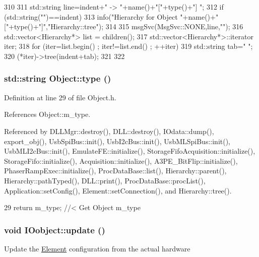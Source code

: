 \begin{DoxyCode}
310                                     {
311   std::string line=indent+" -> "+name()+"["+type()+"] ";
312   if (std::string("")==indent){
313     info("Hierarchy for Object "+name()+"["+type()+"]","Hierarchy::tree");
314   }
315   msgSvc(MsgSvc::NONE,line,"");
316   std::vector<Hierarchy*> list = children();
317   std::vector<Hierarchy*>::iterator iter;
318   for (iter=list.begin() ; iter!=list.end() ; ++iter){
319     std::string tab="  ";
320     (*iter)->tree(indent+tab);
321   }
322 }
\end{DoxyCode}
\hypertarget{classObject_a84f99f70f144a83e1582d1d0f84e4e62}{
\subsubsection[{type}]{\setlength{\rightskip}{0pt plus 5cm}std::string Object::type ()}}
\label{classObject_a84f99f70f144a83e1582d1d0f84e4e62}


Definition at line 29 of file Object.h.

References Object::m\_\-type.

Referenced by DLLMgr::destroy(), DLL::destroy(), IOdata::dump(), export\_\-obj(), UsbSpiBus::init(), UsbI2cBus::init(), UsbMLSpiBus::init(), UsbMLI2cBus::init(), EmulateFE::initialize(), StorageFifoAcquisition::initialize(), StorageFifo::initialize(), Acquisition::initialize(), A3PE\_\-BitFlip::initialize(), PhaserRampExec::initialize(), ProcDataBase::list(), Hierarchy::parent(), Hierarchy::pathTyped(), DLL::print(), ProcDataBase::procList(), Application::setConfig(), Element::setConnection(), and Hierarchy::tree().


\begin{DoxyCode}
29 { return m_type;       } //< Get Object m_type
\end{DoxyCode}
\hypertarget{classIOobject_a0100b4ddcfe8f0b551a3f0dc5201988d}{
\subsubsection[{update}]{\setlength{\rightskip}{0pt plus 5cm}void IOobject::update ()}}
\label{classIOobject_a0100b4ddcfe8f0b551a3f0dc5201988d}
Update the \hyperlink{classElement}{Element} configuration from the actual hardware 

